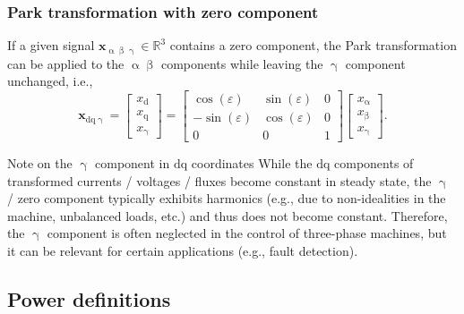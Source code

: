 \begin{frame}
    \frametitle{Park transformation with zero component}
    If a given signal $\bm{x}_{\upalpha\upbeta\upgamma}\in\mathbb{R}^3$ contains a zero component, the Park transformation can be applied to the $\upalpha\upbeta$ components while leaving the $\upgamma$ component unchanged, i.e.,
    \begin{equation}
        \bm{x}_{\mathrm{dq}\upgamma} = \begin{bmatrix} x_\mathrm{d} \\ x_\mathrm{q} \\ x_\upgamma \end{bmatrix} = \begin{bmatrix}
            \cos(\varepsilon)  & \sin(\varepsilon) & 0 \\
            -\sin(\varepsilon) & \cos(\varepsilon) & 0 \\
            0                  & 0                 & 1
        \end{bmatrix} \begin{bmatrix} x_\upalpha \\ x_\upbeta \\ x_\upgamma \end{bmatrix}.
        \label{eq:Park_transform_dqgamma}
    \end{equation}
    \pause

    \begin{varblock}{Note on the $\upgamma$ component in $\mathrm{dq}$ coordinates}
        While the $\mathrm{dq}$ components of transformed currents / voltages / fluxes become constant in steady state, the $\upgamma$ / zero component typically exhibits harmonics (e.g., due to non-idealities in the machine, unbalanced loads, etc.) and thus does not become constant. Therefore, the $\upgamma$ component is often neglected in the control of three-phase machines, but it can be relevant for certain applications (e.g., fault detection).
    \end{varblock}
\end{frame}

\subsection{Power definitions}
\label{subsec:power_def}


